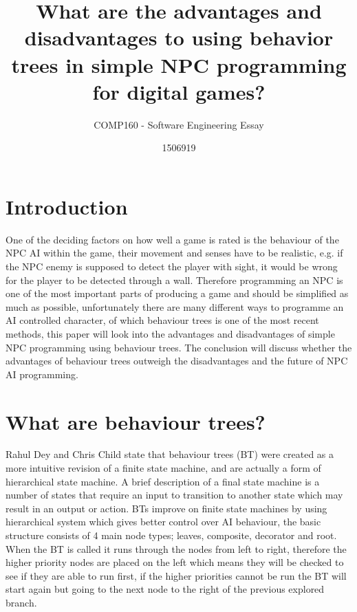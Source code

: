 \documentclass{scrartcl}
\title{What are the advantages and disadvantages to using behavior trees in simple NPC programming for digital games?}
\subtitle{COMP160 - Software Engineering Essay}
\author{1506919}
\begin{document}
\maketitle


\section{Introduction}

One of the deciding factors on how well a game is rated is the behaviour of the NPC AI within the game, their movement and senses have to be realistic\cite{dey2013ql}, e.g. if the NPC enemy is supposed to detect the player with sight, it would be wrong for the player to be detected through a wall. Therefore programming an NPC is one of the most important parts of producing a game\cite{buckland2005programming} and should be simplified as much as possible, unfortunately there are many different ways to programme an AI controlled character, of which behaviour trees is one of the most recent methods\cite{GDCVault}, this paper will look into the advantages and disadvantages of simple NPC programming using behaviour trees. The conclusion will discuss whether the advantages of behaviour trees outweigh the disadvantages and the future of NPC AI programming.

\section{What are behaviour trees?}

Rahul Dey and Chris Child state that behaviour trees (BT) were created as a more intuitive revision of a finite state machine\cite{dey2013ql}, and are actually a form of hierarchical state machine. A brief description of a final state machine is a number of states that require an input to transition to another state which may result in an output or action\cite{buckland2005programming}. BTs improve on finite state machines by using hierarchical system which gives better control over AI behaviour, the basic structure consists of 4 main node types\cite{gamasutra}; leaves, composite, decorator and root. When the BT is called it runs through the nodes from left to right, therefore the higher priority nodes are placed on the left which means they will be checked to see if they are able to run first, if the higher priorities cannot be run the BT will start again but going to the next node to the right of the previous explored branch.
\end{document}
